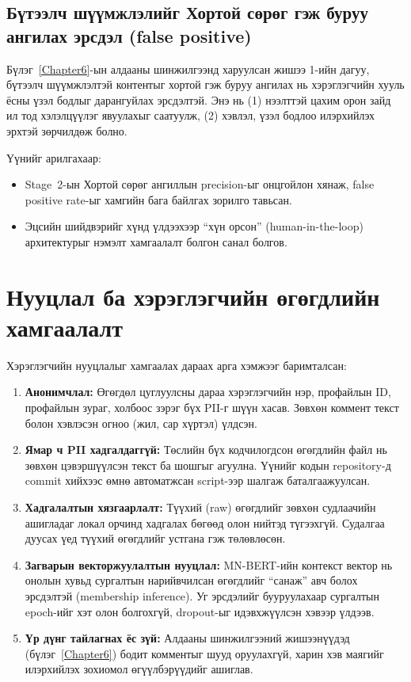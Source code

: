\subsection{Бүтээлч шүүмжлэлийг Хортой сөрөг гэж буруу ангилах эрсдэл (false positive)}

Бүлэг~\ref{Chapter6}-ын алдааны шинжилгээнд харуулсан жишээ 1-ийн дагуу,
бүтээлч шүүмжлэлтэй контентыг хортой гэж буруу ангилах нь хэрэглэгчийн хууль ёсны
үзэл бодлыг дарангуйлах эрсдэлтэй. Энэ нь (1) нээлттэй цахим орон зайд ил тод
хэлэлцүүлэг явуулахыг саатуулж, (2) хэвлэл, үзэл бодлоо илэрхийлэх эрхтэй
зөрчилдөж болно.

Үүнийг арилгахаар:

\begin{itemize}
  \item Stage~2-ын Хортой сөрөг ангиллын precision-ыг онцгойлон хянаж, false positive
    rate-ыг хамгийн бага байлгах зорилго тавьсан.
  \item Эцсийн шийдвэрийг хүнд үлдээхээр ``хүн орсон'' (human-in-the-loop)
    архитектурыг нэмэлт хамгаалалт болгон санал болгов.
\end{itemize}

\section{Нууцлал ба хэрэглэгчийн өгөгдлийн хамгаалалт}

Хэрэглэгчийн нууцлалыг хамгаалах дараах арга хэмжээг баримталсан:

\begin{enumerate}
  \item \textbf{Анонимчлал:} Өгөгдөл цуглуулсны дараа хэрэглэгчийн нэр,
    профайлын ID, профайлын зураг, холбоос зэрэг бүх PII-г шүүн хасав.
    Зөвхөн коммент текст болон хэвлэсэн огноо (жил, сар хүртэл) үлдсэн.
  \item \textbf{Ямар ч PII хадгалдаггүй:} Төслийн бүх кодчилогдсон өгөгдлийн
    файл нь зөвхөн цэвэршүүлсэн текст ба шошгыг агуулна. Үүнийг кодын
    repository-д commit хийхээс өмнө автоматжсан script-ээр шалгаж
    баталгаажуулсан.
  \item \textbf{Хадгалалтын хязгаарлалт:} Түүхий (raw) өгөгдлийг зөвхөн
    судлаачийн ашигладаг локал орчинд хадгалах бөгөөд олон нийтэд
    түгээхгүй. Судалгаа дуусах үед түүхий өгөгдлийг устгана гэж
    төлөвлөсөн.
  \item \textbf{Загварын векторжуулалтын нууцлал:} MN-BERT-ийн контекст
    вектор нь онолын хувьд сургалтын нарийвчилсан өгөгдлийг ``санаж''
    авч болох эрсдэлтэй (membership inference). Уг эрсдэлийг бууруулахаар
    сургалтын epoch-ийг хэт олон болгохгүй, dropout-ыг идэвхжүүлсэн
    хэвээр үлдээв.
  \item \textbf{Үр дүнг тайлагнах ёс зүй:} Алдааны шинжилгээний жишээнүүдэд
    (бүлэг~\ref{Chapter6}) бодит комментыг шууд оруулахгүй, харин хэв
    маягийг илэрхийлэх зохиомол өгүүлбэрүүдийг ашиглав.
\end{enumerate}

